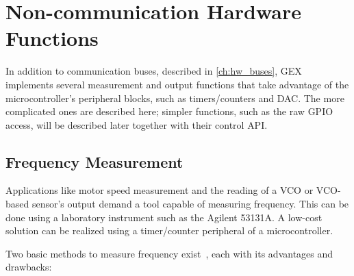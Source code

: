 \chapter{Non-communication Hardware Functions}

In addition to communication buses, described in \cref{ch:hw_buses}, GEX implements several measurement and output functions that take advantage of the microcontroller's peripheral blocks, such as timers/counters and \gls{DAC}. The more complicated ones are described here; simpler functions, such as the raw \gls{GPIO} access, will be described later together with their control \gls{API}.

\section{Frequency Measurement} \label{sec:theory-fcap}

Applications like motor speed measurement and the reading of a \gls{VCO} or \gls{VCO}-based sensor's output demand a tool capable of measuring frequency. This can be done using a laboratory instrument such as the Agilent 53131A. A low-cost solution can be realized using a timer/counter peripheral of a microcontroller.

\noindent
Two basic methods to measure frequency exist~\cite{fcap-twotypes}, each with its advantages and drawbacks:


